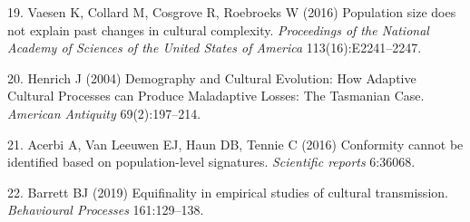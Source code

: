 \documentclass[9pt,twocolumn,twoside,]{pnas-new}
\begin{document}
\leavevmode\hypertarget{ref-vaesen_population_2016}{}%
19. Vaesen K, Collard M, Cosgrove R, Roebroeks W (2016) Population size
does not explain past changes in cultural complexity. \emph{Proceedings
of the National Academy of Sciences of the United States of America}
113(16):E2241--2247.

\leavevmode\hypertarget{ref-henrich_demography_2004}{}%
20. Henrich J (2004) Demography and Cultural Evolution: How Adaptive
Cultural Processes can Produce Maladaptive Losses: The Tasmanian Case.
\emph{American Antiquity} 69(2):197--214.

\leavevmode\hypertarget{ref-acerbi_conformity_2016}{}%
21. Acerbi A, Van Leeuwen EJ, Haun DB, Tennie C (2016) Conformity cannot
be identified based on population-level signatures. \emph{Scientific
reports} 6:36068.

\leavevmode\hypertarget{ref-barrett_equifinality_2019}{}%
22. Barrett BJ (2019) Equifinality in empirical studies of cultural
transmission. \emph{Behavioural Processes} 161:129--138.



% 
\end{document}
